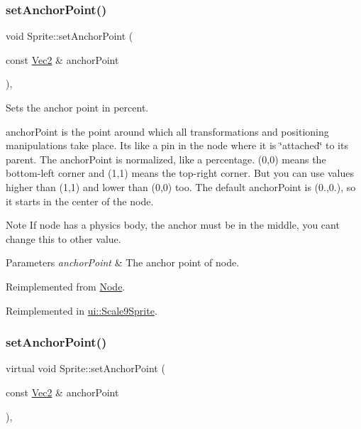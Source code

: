 \subsubsection{\texorpdfstring{set\+Anchor\+Point()}{setAnchorPoint()}\hspace{0.1cm}{\footnotesize\ttfamily [1/2]}}
{\footnotesize\ttfamily void Sprite\+::set\+Anchor\+Point (\begin{DoxyParamCaption}\item[{const \hyperlink{classVec2}{Vec2} \&}]{anchor\+Point }\end{DoxyParamCaption})\hspace{0.3cm}{\ttfamily [override]}, {\ttfamily [virtual]}}

Sets the anchor point in percent.

anchor\+Point is the point around which all transformations and positioning manipulations take place. It\textquotesingle{}s like a pin in the node where it is \char`\"{}attached\char`\"{} to its parent. The anchor\+Point is normalized, like a percentage. (0,0) means the bottom-\/left corner and (1,1) means the top-\/right corner. But you can use values higher than (1,1) and lower than (0,0) too. The default anchor\+Point is (0.,0.), so it starts in the center of the node. \begin{DoxyNote}{Note}
If node has a physics body, the anchor must be in the middle, you can\textquotesingle{}t change this to other value.
\end{DoxyNote}

\begin{DoxyParams}{Parameters}
{\em anchor\+Point} & The anchor point of node. \\
\hline
\end{DoxyParams}


Reimplemented from \hyperlink{classNode_a4dd45cb48a51df7c257675f527e3f277}{Node}.



Reimplemented in \hyperlink{classui_1_1Scale9Sprite_a7153fb170a630efc0748e0db6678963f}{ui\+::\+Scale9\+Sprite}.

\mbox{\label{classSprite_a218c16399fb6c93f2f6dd7b29b54e238}} 
\subsubsection{\texorpdfstring{set\+Anchor\+Point()}{setAnchorPoint()}\hspace{0.1cm}{\footnotesize\ttfamily [2/2]}}
{\footnotesize\ttfamily virtual void Sprite\+::set\+Anchor\+Point (\begin{DoxyParamCaption}\item[{const \hyperlink{classVec2}{Vec2} \&}]{anchor\+Point }\end{DoxyParamCaption})\hspace{0.3cm}{\ttfamily [override]}, {\ttfamily [virtual]}}

